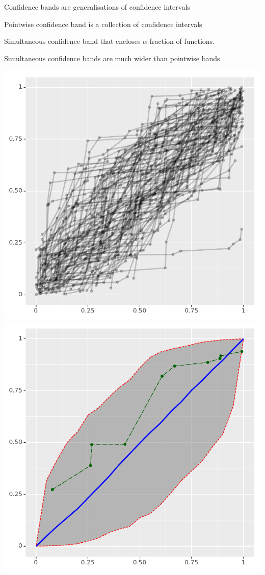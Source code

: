 \documentclass[landscape,footrule]{foils}
\begin{document}
Confidence bands are generalisations of confidence intervals
\begin{triangles}
\item Pointwise confidence band is a collection of confidence intervals
\item Simultaneous confidence band that encloses $\alpha$-fraction of functions.  
\item Simultaneous confidence bands are much wider than pointwise bands.  
\end{triangles}


\enlargethispage{0.5cm}
\centerline{
\includegraphics[scale=0.8]{qq_line_distribution}
\includegraphics[scale=0.8]{qq_confidence_envelope}}
\end{document}
